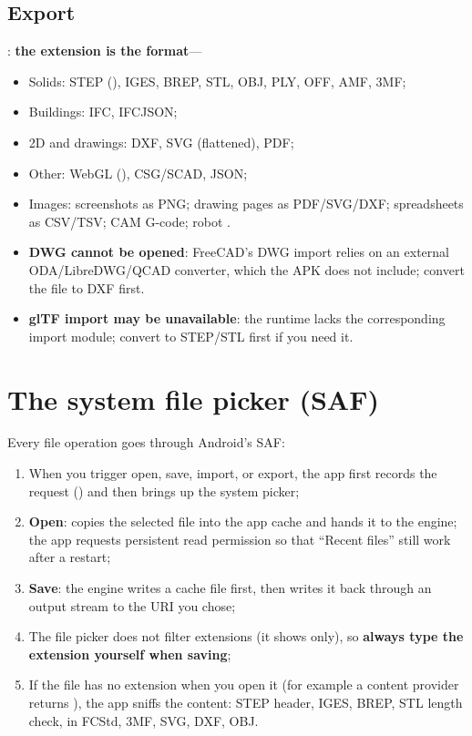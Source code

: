 \subsection{Export}

: \textbf{the extension is the format}---

\begin{itemize}
  \item Solids: STEP (), IGES, BREP, STL, OBJ, PLY, OFF, AMF, 3MF;
  \item Buildings: IFC, IFCJSON;
  \item 2D and drawings: DXF, SVG (flattened), PDF;
  \item Other: WebGL (), CSG/SCAD, JSON;
  \item Images: screenshots as PNG; drawing pages as PDF/SVG/DXF; spreadsheets as CSV/TSV; CAM G-code; robot .
\end{itemize}

\begin{warn}
\begin{itemize}
  \item \textbf{DWG cannot be opened}: FreeCAD's DWG import relies on an external ODA/LibreDWG/QCAD converter,
        which the APK does not include; convert the file to DXF first.
  \item \textbf{glTF import may be unavailable}: the runtime lacks the corresponding import module; convert to
        STEP/STL first if you need it.
\end{itemize}
\end{warn}

\section{The system file picker (SAF)}

Every file operation goes through Android's SAF:

\begin{enumerate}
  \item When you trigger open, save, import, or export, the app first records the request () and then
        brings up the system picker;
  \item \textbf{Open}: copies the selected file into the app cache and hands it to the engine; the app requests
        persistent read permission so that ``Recent files'' still work after a restart;
  \item \textbf{Save}: the engine writes a cache file first, then writes it back through an output stream to the URI you chose;
  \item The file picker does not filter extensions (it shows \file{*/*} only), so \textbf{always type the extension
        yourself when saving};
  \item If the file has no extension when you open it (for example a content provider returns ),
        the app sniffs the content: STEP header, IGES, BREP, STL length check,  in FCStd, 3MF, SVG, DXF, OBJ.
\end{enumerate}

